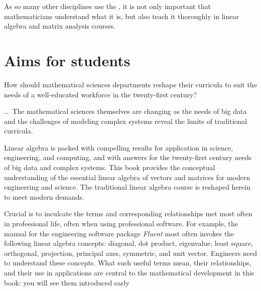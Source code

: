 \begin{quoted}{\cite{Turner2014}}%
As so many other disciplines use the \svd, it is not only important that mathematicians understand what it is, but also teach it thoroughly in linear algebra and matrix analysis courses.
\end{quoted}











\section*{Aims for students}

\begin{quoted}{\cite{Bressoud2014}}
How should mathematical sciences departments reshape their curricula to suit the needs of a well-educated workforce in the twenty-first century?

\ldots\
The mathematical sciences themselves are changing as the needs of big data and the challenges of modeling complex systems reveal the limits of traditional curricula.
%
\end{quoted}



Linear algebra is packed with compelling results for application in science, engineering, and computing, and with answers for the twenty-first century needs of big data and complex systems.
This book provides the conceptual understanding of the essential linear algebra of vectors and matrices for modern engineering and science.
The traditional linear algebra course is reshaped herein to meet modern demands.

Crucial is to inculcate the terms and corresponding relationships met most often in professional life, often when using professional software.  
For example, the manual for the engineering software package \emph{Fluent} most often invokes the following linear algebra concepts: diagonal, dot product, eigenvalue, least square, orthogonal, projection, principal axes, symmetric, and unit vector.
Engineers need to understand these concepts.
What such useful terms mean, their relationships, and their use in applications are central to the mathematical development in this book: you will see them introduced early 

